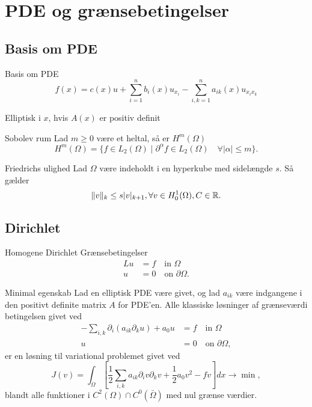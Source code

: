 
\section{PDE og grænsebetingelser}
\subsection{Basis om PDE}
\begin{frame}{Basis om PDE}{}
    \begin{equation*}
        f(x) = c(x) u + \sum_{i=1}^{n}b_i(x)u_{x_{i}}
       - \sum_{i,k=1}^{n}a_{ik}(x)u_{x_i x_k}
   \end{equation*}    

   Elliptisk i $x$, hvis $A(x)$ er positiv definit
\end{frame}

\begin{frame}{Sobolev rum}{}
    Lad $m \geq 0$ være et heltal, så er $H^m(\Omega)$
    \begin{equation*}
        H^m(\Omega) = \{  f \in L_2(\Omega) \mid \partial ^{\alpha}f \in 
        L_2(\Omega) \quad \forall |\alpha| \leq m  \}.
    \end{equation*}
\end{frame}

\begin{frame}{Friedrichs ulighed}{}
    Lad $\Omega$ være indeholdt i en hyperkube med sidelængde $s$. Så gælder
    \begin{equation*}
        \| v \|_{k} \leq s |v|_{k+1}, \forall v \in H_0^1(\Omega), C \in \mathbb{R}.
    \end{equation*}
\end{frame}

\subsection{Dirichlet}
\begin{frame}{Homogene Dirichlet Grænsebetingelser}{}
    \begin{align*}
        Lu &= f \quad \text{in } \Omega\\
        u &= 0 \quad \text{on } \partial \Omega.
    \end{align*}
\end{frame}

\begin{frame}{Minimal egenskab}{}
    Lad en elliptisk PDE være givet, og lad $a_{ik}$ være indgangene i den positivt definite matrix $A$ for PDE'en.
    Alle klassiske løsninger af grænseværdi betingelsen givet ved
    \begin{align}
        -\sum_{i,k} \partial_i (a_{ik}\partial_k u) + a_0 u &= f \quad \text{in } \Omega  \\
        u &= 0 \quad \text{on } \partial \Omega,
    \end{align}
        er en løsning til variational problemet givet ved
        \[
            J(v)=\int_\Omega \left [\frac{1}{2}\sum_{i,k} a_{ik} \partial_i v\partial_k v + \frac{1}{2} a_0 v^2 -fv\right ]dx \longrightarrow \min,
        \]
        blandt alle funktioner i $C^2(\Omega)\cap C^0(\bar{\Omega})$ med nul grænse værdier.
\end{frame}

